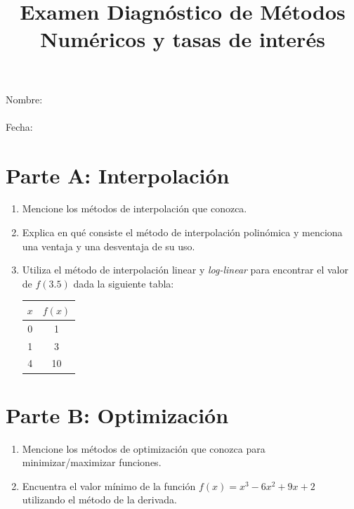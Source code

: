 \documentclass[12pt]{article}
\begin{document}
	
	\title{Examen Diagnóstico de Métodos Numéricos y tasas de interés}
	\date{}
	\maketitle
	
	Nombre: \underline{\hspace{6cm}} 
	\\
	\\
	Fecha: \underline{\hspace{6cm}}
	
	\section*{Parte A: Interpolación}
	
	\begin{enumerate}
		\item Mencione los métodos de interpolación que conozca.
		
		\item Explica en qué consiste el método de interpolación polinómica y menciona una ventaja y una desventaja de su uso.
		
		\item Utiliza el método de interpolación linear y \textit{log-linear} para encontrar el valor de $f(3.5)$ dada la siguiente tabla:
		
		\begin{tabular}{|c|c|}
			\hline
			$x$ & $f(x)$ \\
			\hline
			0 & 1 \\
			1 & 3 \\
			4 & 10 \\
			\hline
		\end{tabular}
	\end{enumerate}
	
	\section*{Parte B: Optimización}
	
	\begin{enumerate}[resume]
		\item Mencione los métodos de optimización que conozca para minimizar/maximizar funciones.
		
		\item Encuentra el valor mínimo de la función $f(x) = x^3 - 6x^2 + 9x + 2$ utilizando el método de la derivada.
	\end{enumerate}
	
\end{document}
